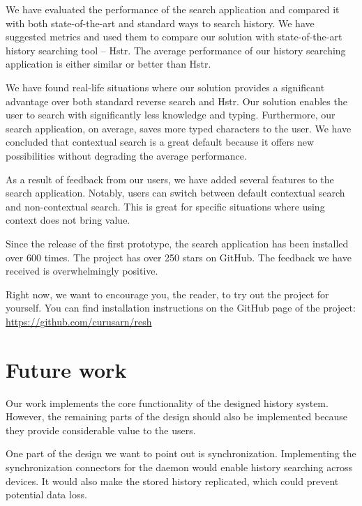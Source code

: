 \documentclass[thesis=M,english]{FITthesis}[2012/10/20]
\let\myCite\cite
\renewcommand\cite{\unskip~\myCite}
\begin{document}
\begin{conclusion}

We have evaluated the performance of the search application and compared it with both state-of-the-art and standard ways to search history. 
We have suggested metrics and used them to compare our solution with state-of-the-art history searching tool -- Hstr.%
The average performance of our history searching application is either similar or better than Hstr. 

We have found real-life situations where our solution provides a significant advantage over both standard reverse search and Hstr.
Our solution enables the user to search with significantly less knowledge and typing. Furthermore, our search application, on average, saves more typed characters to the user. 
We have concluded that contextual search is a great default because it offers new possibilities without degrading the average performance.


As a result of feedback from our users, we have added several features to the search application. Notably, users can switch between default contextual search and non-contextual search. This is great for specific situations where using context does not bring value.

Since the release of the first prototype, the search application has been installed over 600 times. The project has over 250 stars on GitHub. The feedback we have received is overwhelmingly positive. %

Right now, we want to encourage you, the reader, to try out the project for yourself. You can find installation instructions on the GitHub page of the project: \url{https://github.com/curusarn/resh} %


\section*{Future work}

Our work implements the core functionality of the designed history system. However, the remaining parts of the design should also be implemented because they provide considerable value to the users.

One part of the design we want to point out is synchronization.
Implementing the synchronization connectors for the daemon would enable history searching across devices. It would also make the stored history replicated, which could prevent potential data loss.


\end{conclusion}
\end{document}
